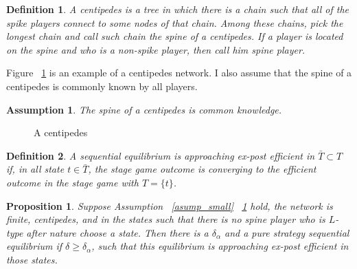 \documentclass[12pt,letter]{article}
\newtheorem{proposition}{Proposition}[section]
\newtheorem{definition}{Definition}[section]
\newtheorem{assumption}{Assumption}[section]
\theoremstyle{remark}
\theoremstyle{remark}
\theoremstyle{claim}
\begin{document}
\begin{definition}
A centipedes is a tree in which there is a chain such that all of the spike players connect to some nodes of that chain. Among these chains, pick the longest chain and call such chain the spine of a centipedes. If a player is located on the spine and who is a non-spike player, then call him spine player.
\end{definition}

Figure ~\ref{fig_centi} is an example of a centipedes network. I also assume that the spine of a centipedes is commonly known by all players. 

\begin{assumption}
\label{assum_spine}
The spine of a centipedes is common knowledge.
\end{assumption}

\begin{figure}
\caption{A centipedes}
\label{fig_centi}
\begin{center}
\end{center}
\end{figure}

\begin{definition} A sequential equilibrium is \textit{approaching ex-post efficient in $\bar{T}\subset T$} if, in all state $t\in \bar{T}$, the stage game outcome is converging to the efficient outcome in the stage game with $T=\{t\}$. \end{definition}

\begin{proposition}
\label{prop_centi}
Suppose Assumption ~\ref{asump_small} ~\ref{assum_spine} hold, the network is finite, centipedes, and in the states such that there is no spine player who is $L$-type after nature choose a state. Then there is a $\delta_{\alpha}$ and a pure strategy sequential equilibrium if $\delta\geq\delta_{\alpha}$, such that this equilibrium is approaching ex-post efficient in those states.
\end{proposition}
\end{document}

